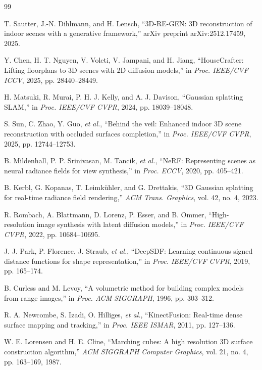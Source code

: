 \documentclass[12pt,a4paper,final]{extreport}
\begin{document}
\begin{thebibliography}{99}

T. Sautter, J.-N. Dihlmann, and H. Lensch, ``3D-RE-GEN: 3D reconstruction of indoor scenes with a generative framework,'' arXiv preprint arXiv:2512.17459, 2025.

Y. Chen, H. T. Nguyen, V. Voleti, V. Jampani, and H. Jiang, ``HouseCrafter: Lifting floorplans to 3D scenes with 2D diffusion models,'' in \textit{Proc. IEEE/CVF ICCV}, 2025, pp. 28440--28449.

H. Matsuki, R. Murai, P. H. J. Kelly, and A. J. Davison, ``Gaussian splatting SLAM,'' in \textit{Proc. IEEE/CVF CVPR}, 2024, pp. 18039--18048.

S. Sun, C. Zhao, Y. Guo, \textit{et al.}, ``Behind the veil: Enhanced indoor 3D scene reconstruction with occluded surfaces completion,'' in \textit{Proc. IEEE/CVF CVPR}, 2025, pp. 12744--12753.

B. Mildenhall, P. P. Srinivasan, M. Tancik, \textit{et al.}, ``NeRF: Representing scenes as neural radiance fields for view synthesis,'' in \textit{Proc. ECCV}, 2020, pp. 405--421.

B. Kerbl, G. Kopanas, T. Leimk\"uhler, and G. Drettakis, ``3D Gaussian splatting for real-time radiance field rendering,'' \textit{ACM Trans. Graphics}, vol. 42, no. 4, 2023.

R. Rombach, A. Blattmann, D. Lorenz, P. Esser, and B. Ommer, ``High-resolution image synthesis with latent diffusion models,'' in \textit{Proc. IEEE/CVF CVPR}, 2022, pp. 10684--10695.

J. J. Park, P. Florence, J. Straub, \textit{et al.}, ``DeepSDF: Learning continuous signed distance functions for shape representation,'' in \textit{Proc. IEEE/CVF CVPR}, 2019, pp. 165--174.

B. Curless and M. Levoy, ``A volumetric method for building complex models from range images,'' in \textit{Proc. ACM SIGGRAPH}, 1996, pp. 303--312.

R. A. Newcombe, S. Izadi, O. Hilliges, \textit{et al.}, ``KinectFusion: Real-time dense surface mapping and tracking,'' in \textit{Proc. IEEE ISMAR}, 2011, pp. 127--136.

W. E. Lorensen and H. E. Cline, ``Marching cubes: A high resolution 3D surface construction algorithm,'' \textit{ACM SIGGRAPH Computer Graphics}, vol. 21, no. 4, pp. 163--169, 1987.

\end{thebibliography}
\endgroup
\end{document}
